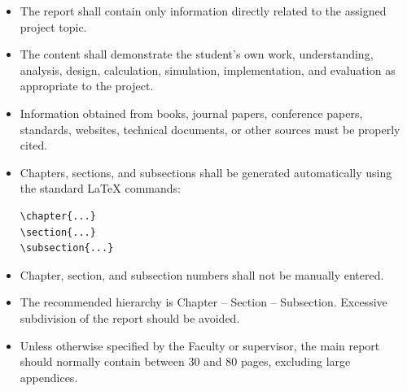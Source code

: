 {

\begin{itemize}[leftmargin=0.8cm, itemsep=3pt]

    \item The report shall contain only information directly related
    to the assigned project topic.

    \item The content shall demonstrate the student's own work,
    understanding, analysis, design, calculation, simulation,
    implementation, and evaluation as appropriate to the project.

    \item Information obtained from books, journal papers,
    conference papers, standards, websites, technical documents,
    or other sources must be properly cited.

    \item Chapters, sections, and subsections shall be generated
    automatically using the standard \LaTeX{} commands:

\begin{verbatim}
\chapter{...}
\section{...}
\subsection{...}
\end{verbatim}

    \item Chapter, section, and subsection numbers shall not be
    manually entered.

    \item The recommended hierarchy is Chapter -- Section --
    Subsection. Excessive subdivision of the report should be avoided.

    \item Unless otherwise specified by the Faculty or supervisor,
    the main report should normally contain between 30 and 80 pages,
    excluding large appendices.

\end{itemize}


}
